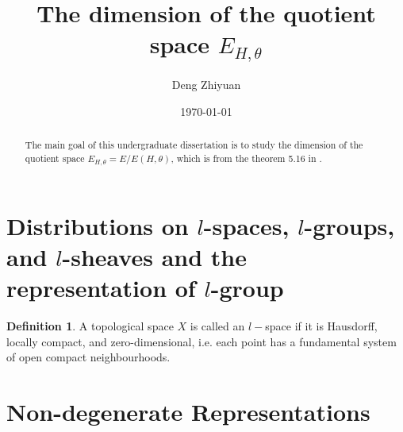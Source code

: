 \documentclass[12pt,a4paper,english]{article}
\title{The dimension of the quotient space $E_{H,\theta}$}
\date{\today}
\author{Deng Zhiyuan}
\theoremstyle{plain}
\theoremstyle{definition}
\newtheorem{defi}{Definition}
\theoremstyle{remark}
\begin{document}
\maketitle
\newpage

\tableofcontents
\newpage

\begin{abstract}
The main goal of this undergraduate dissertation is to study the dimension of the quotient space $E_{H,\theta}=E/E(H,\theta)$, which is from the theorem 5.16 in \cite{bernstein1976representations}.
\end{abstract}
\newpage

\section{Distributions on $l$-spaces, $l$-groups, and $l$-sheaves and the representation of $l$-group}
\begin{defi}
A topological space $X$ is called an $l-$space if it is Hausdorff, locally compact, and zero-dimensional, i.e. each point has a fundamental system of open compact neighbourhoods.
\end{defi}
\section{Non-degenerate Representations}

 





\newpage


\end{document}
